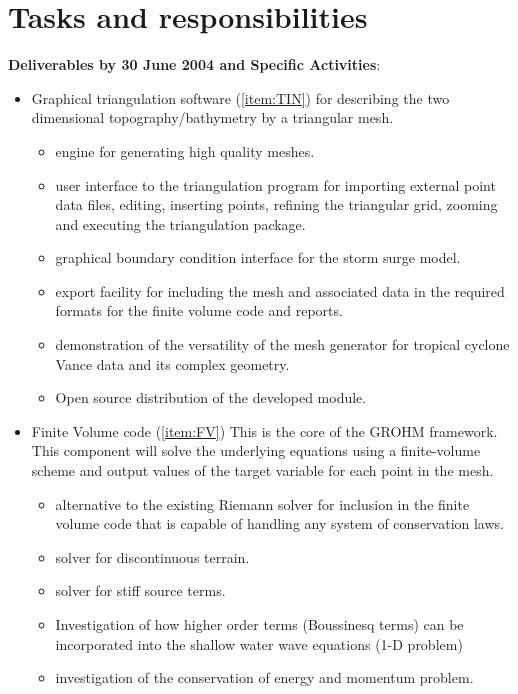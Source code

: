 \documentclass{article}
\begin{document}
\pagebreak
\section{Tasks and responsibilities}
\noindent\textbf{Deliverables by 30 June 2004 and Specific Activities}:

%
%
\begin{itemize}
\item Graphical triangulation software (\ref{item:TIN}) for describing
the two dimensional topography/bathymetry by a triangular mesh.  

  \begin{itemize}
      \item engine for generating high quality meshes.
      \item user interface to the triangulation program for
      importing external point data files, editing, inserting points,
      refining the triangular grid, zooming and executing the
      triangulation package.
      \item graphical boundary condition interface for the storm surge model.
      \item export facility for including the mesh and associated data in
      the required formats for the finite volume code and reports.
      \item demonstration of the versatility of the mesh generator for tropical
      cyclone Vance data and its complex geometry.
      \item Open source distribution of the developed module.
  \end{itemize} 

  \item Finite Volume code (\ref{item:FV}) This is the core of the GROHM
  framework.  This component will solve the underlying equations using
  a finite-volume scheme and output values of the target variable for
  each point in the mesh.
  \begin{itemize}
      \item alternative to the existing Riemann solver for
      inclusion in the finite volume code that is capable of handling
      any system of conservation laws.
      \item solver for discontinuous terrain.
      \item solver for stiff source terms.      
      \item Investigation of how higher order terms (Boussinesq terms) can be
      incorporated into the shallow water wave equations (1-D problem)
      \item investigation of the conservation of energy and momentum problem.
  \end{itemize}


\end{itemize}
\end{document}
